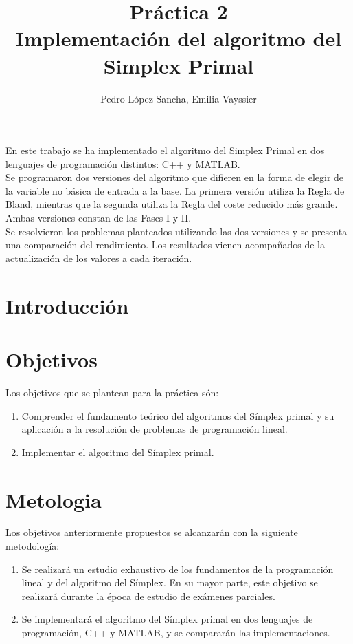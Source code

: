 \documentclass[12pt, titlepage]{article}
\title{Práctica 2\\ 
\large Implementación del algoritmo del Simplex Primal }
\author{Pedro López Sancha, Emilia Vayssier}
\begin{document}
\maketitle

En este trabajo se ha implementado el algoritmo del Simplex Primal en dos lenguajes de programación distintos: C++ y MATLAB. \\
Se programaron dos versiones del algoritmo que difieren en la forma de elegir de la variable no básica de entrada a la base. La primera versión utiliza la Regla de Bland, mientras que la segunda utiliza la Regla del coste reducido más grande. Ambas versiones constan de las Fases I y II. \\
Se resolvieron los problemas planteados utilizando las dos versiones y se presenta una comparación del rendimiento. Los resultados vienen acompañados de la actualización de los valores a cada iteración.
\newpage

\section{Introducción}
\section{Objetivos}
Los objetivos que se plantean para la práctica són:
\begin{enumerate}
\item	Comprender el fundamento teórico del algoritmos del Símplex primal y su aplicación a la resolución de problemas de programación lineal.
\item	Implementar el algoritmo del Símplex primal.
\end{enumerate}
\section{Metologia}
Los objetivos anteriormente propuestos se alcanzarán con la siguiente metodología:
\begin{enumerate}
\item	Se realizará un estudio exhaustivo de los fundamentos de la programación lineal y del algoritmo del Símplex. En su mayor parte, este objetivo se realizará durante la época de estudio de exámenes parciales.
\item	Se implementará el algoritmo del Símplex primal en dos lenguajes de programación, C++ y MATLAB, y se compararán las implementaciones.
\end{enumerate}
\end{document}
